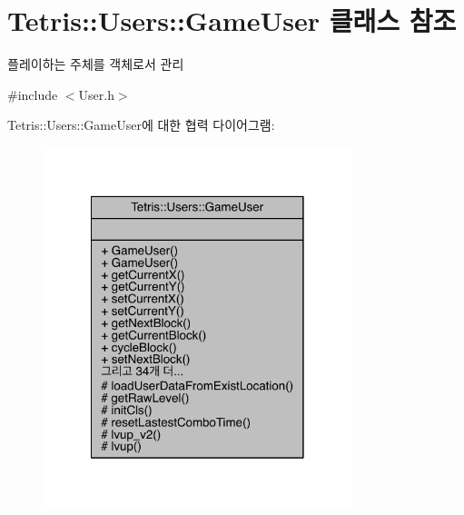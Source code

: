 \hypertarget{class_tetris_1_1_users_1_1_game_user}{}\section{Tetris\+:\+:Users\+:\+:Game\+User 클래스 참조}
\label{class_tetris_1_1_users_1_1_game_user}


플레이하는 주체를 객체로서 관리  




{\ttfamily \#include $<$User.\+h$>$}



Tetris\+:\+:Users\+:\+:Game\+User에 대한 협력 다이어그램\+:
\nopagebreak
\begin{figure}[H]
\begin{center}
\leavevmode
\includegraphics[width=254pt]{class_tetris_1_1_users_1_1_game_user__coll__graph}
\end{center}
\end{figure}
